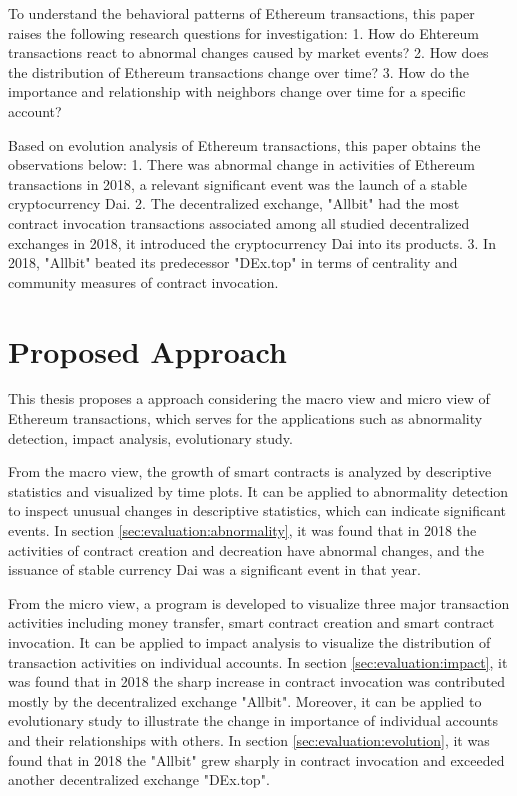 To understand the behavioral patterns of Ethereum transactions, this paper raises the following research questions for investigation:
1. How do Ehtereum transactions react to abnormal changes caused by market events?
2. How does the distribution of Ethereum transactions change over time?
3. How do the importance and relationship with neighbors change over time for a specific account?

Based on evolution analysis of Ethereum transactions, this paper obtains the observations below:
1. There was abnormal change in activities of Ethereum transactions in 2018, a relevant significant event was the launch of a stable cryptocurrency Dai.
2. The decentralized exchange, "Allbit" had the most contract invocation transactions associated among all studied decentralized exchanges in 2018, it introduced the cryptocurrency Dai into its products.
3. In 2018, "Allbit" beated its predecessor "DEx.top" in terms of centrality and community measures of contract invocation.

\section{Proposed Approach}
\label{sec:intro:proposed}

This thesis proposes a approach considering the macro view and micro view of Ethereum transactions, which serves for the applications such as abnormality detection, impact analysis, evolutionary study.

From the macro view, the growth of smart contracts is analyzed by descriptive statistics and visualized by time plots. It can be applied to abnormality detection to inspect unusual changes in descriptive statistics, which can indicate significant events. In section \ref{sec:evaluation:abnormality}, it was found that in 2018 the activities of contract creation and decreation have abnormal changes, and the issuance of stable currency Dai was a significant event in that year.

From the micro view, a program is developed to visualize three major transaction activities including money transfer, smart contract creation and smart contract invocation. It can be applied to impact analysis to visualize the distribution of transaction activities on individual accounts. In section \ref{sec:evaluation:impact}, it was found that in 2018 the sharp increase in contract invocation was contributed mostly by the decentralized exchange "Allbit". Moreover, it can be applied to evolutionary study to illustrate the change in importance of individual accounts and their relationships with others. In section \ref{sec:evaluation:evolution}, it was found that in 2018 the "Allbit" grew sharply in contract invocation and exceeded another decentralized exchange "DEx.top".

